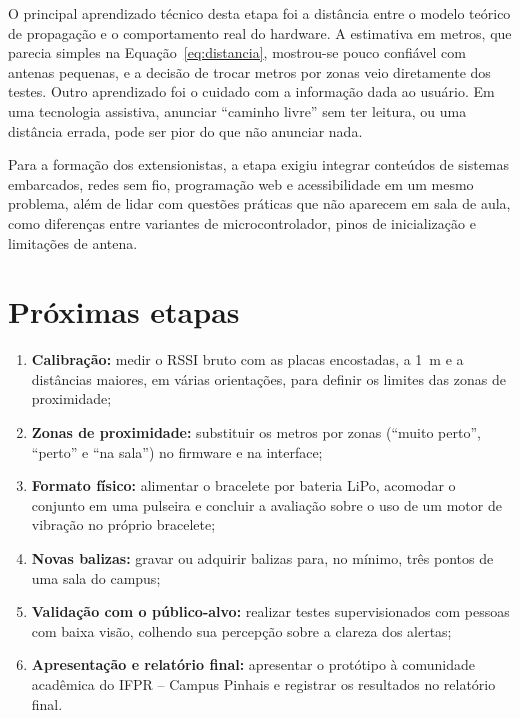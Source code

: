 O principal aprendizado técnico desta etapa foi a distância entre o modelo teórico de propagação e o comportamento real do hardware. A estimativa em metros, que parecia simples na Equação~\ref{eq:distancia}, mostrou-se pouco confiável com antenas pequenas, e a decisão de trocar metros por zonas veio diretamente dos testes. Outro aprendizado foi o cuidado com a informação dada ao usuário. Em uma tecnologia assistiva, anunciar ``caminho livre'' sem ter leitura, ou uma distância errada, pode ser pior do que não anunciar nada.

Para a formação dos extensionistas, a etapa exigiu integrar conteúdos de sistemas embarcados, redes sem fio, programação web e acessibilidade em um mesmo problema, além de lidar com questões práticas que não aparecem em sala de aula, como diferenças entre variantes de microcontrolador, pinos de inicialização e limitações de antena.

\section{Próximas etapas}
\label{sec:proximas}

\begin{enumerate}
    \item \textbf{Calibração:} medir o RSSI bruto com as placas encostadas, a 1~m e a distâncias maiores, em várias orientações, para definir os limites das zonas de proximidade;
    \item \textbf{Zonas de proximidade:} substituir os metros por zonas (``muito perto'', ``perto'' e ``na sala'') no firmware e na interface;
    \item \textbf{Formato físico:} alimentar o bracelete por bateria LiPo, acomodar o conjunto em uma pulseira e concluir a avaliação sobre o uso de um motor de vibração no próprio bracelete;
    \item \textbf{Novas balizas:} gravar ou adquirir balizas para, no mínimo, três pontos de uma sala do campus;
    \item \textbf{Validação com o público-alvo:} realizar testes supervisionados com pessoas com baixa visão, colhendo sua percepção sobre a clareza dos alertas;
    \item \textbf{Apresentação e relatório final:} apresentar o protótipo à comunidade acadêmica do IFPR -- Campus Pinhais e registrar os resultados no relatório final.
\end{enumerate}
